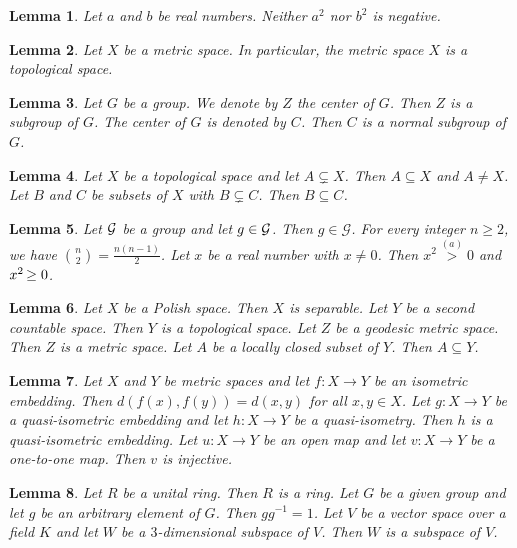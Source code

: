 \documentclass{article}
\newtheorem{lemma}{Lemma}
\begin{document}
\begin{lemma}\label{neither-nor}
Let $a$ and $b$ be real numbers. Neither $a^2$ nor $b^2$ is negative.
\end{lemma}

\begin{lemma}\label{the-noun-subject}
Let $X$ be a metric space. In particular, the metric space $X$ is a topological space.
\end{lemma}

\begin{lemma}\label{denoted-by}
Let $G$ be a group. We denote by $Z$ the center of $G$. Then $Z$ is a subgroup of $G$. The center of $G$ is denoted by $C$. Then $C$ is a normal subgroup of $G$.
\end{lemma}

\begin{lemma}\label{proper-subsets}
Let $X$ be a topological space and let $A\subsetneq X$. Then $A\subseteq X$ and $A\neq X$. Let $B$ and $C$ be subsets of $X$ with $B\subsetneq C$. Then $B\subseteq C$.
\end{lemma}

\begin{lemma}\label{old-notation}
Let ${\cal G}$ be a group and let $g\in{\cal G}$. Then $g\in\mathcal{G}$. For every integer $n\ge 2$, we have ${n \choose 2}=\frac{n(n-1)}{2}$. Let $x$ be a real number with $x\not= 0$. Then $x^2\stackrel{(a)}{>} 0$ and $\smash{x}^2\mkern-2mu\ge 0$.
\end{lemma}

\begin{lemma}\label{more-spaces}
Let $X$ be a Polish space. Then $X$ is separable. Let $Y$ be a second countable space. Then $Y$ is a topological space. Let $Z$ be a geodesic metric space. Then $Z$ is a metric space. Let $A$ be a locally closed subset of $Y$. Then $A\subseteq Y$.
\end{lemma}

\begin{lemma}\label{more-maps}
Let $X$ and $Y$ be metric spaces and let $f\colon X\to Y$ be an isometric embedding. Then $d(f(x),f(y))=d(x,y)$ for all $x,y\in X$. Let $g\colon X\to Y$ be a quasi-isometric embedding and let $h\colon X\to Y$ be a quasi-isometry. Then $h$ is a quasi-isometric embedding. Let $u\colon X\to Y$ be an open map and let $v\colon X\to Y$ be a one-to-one map. Then $v$ is injective.
\end{lemma}

\begin{lemma}\label{more-algebra}
Let $R$ be a unital ring. Then $R$ is a ring. Let $G$ be a given group and let $g$ be an arbitrary element of $G$. Then $gg^{-1}=1$. Let $V$ be a vector space over a field $K$ and let $W$ be a $3$-dimensional subspace of $V$. Then $W$ is a subspace of $V$.
\end{lemma}
\end{document}

